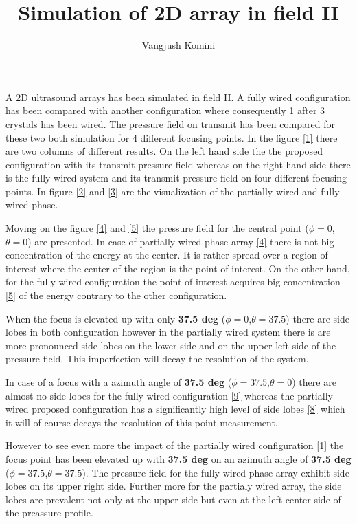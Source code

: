 \documentclass[a4paper]{article}
\title{Simulation of 2D array in field II}
\author{
\href{mailto:vangjush.komini@uzleuven.be}{Vangjush Komini}\\ 
}
\begin{document}
\maketitle


A 2D ultrasound arrays has been simulated in field II. A fully wired configuration has been compared with another configuration where consequently 1 after 3 crystals has been wired.
The pressure field on transmit has been compared for these two both simulation for 4 different focusing points. In the figure \ref{1} there are two columns of different results. On the left hand side the the proposed configuration with its transmit pressure field whereas on the right hand side there is the fully wired system and its transmit pressure field on four different focusing points.
In figure \ref{2} and \ref{3} are the visualization of the partially wired and fully wired phase.

Moving on the figure \ref{4}  and \ref{5} the pressure field for the central point ($\phi=0$,$\theta=0$) are presented. In case of partially wired phase array \ref{4} there is not big concentration of the energy at the center. It is rather spread over a region of interest where the center of the region is the point of interest. On the other hand,  for the fully wired configuration the point of interest acquires big concentration \ref{5} of the energy contrary to the other configuration.

When the focus is elevated up with only \textbf{37.5 deg}  ($\phi=0$,$\theta=37.5$) there are side lobes in both configuration however in the partially wired system there is are more pronounced side-lobes on the lower side and on the upper left side of the pressure field. This imperfection will decay the resolution of the system. 

In case of a focus with a azimuth angle of \textbf{37.5 deg} ($\phi=37.5$,$\theta=0$) there are almost no side lobes for the fully wired configuration \ref{9} whereas the partially wired proposed configuration has a significantly high level of side lobes \ref{8} which it will of course decays the resolution of this point measurement. 


However to see even more the impact of the partially wired configuration \ref{1} the focus point has been elevated up with \textbf{37.5 deg} on an azimuth angle of \textbf{37.5 deg} ($\phi=37.5$,$\theta=37.5$). The pressure field for the fully wired phase array exhibit side lobes on its upper right side. Further more for the partialy wired array, the side lobes are prevalent not only at the upper side but even at the left center side of the preassure profile. 
\end{document}

